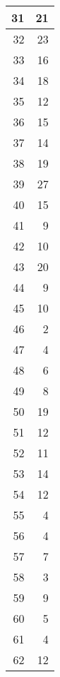 \begin{tabular}{|r|r|}
\hline
31&21\\
\hline
32&23\\
\hline
33&16\\
\hline
34&18\\
\hline
35&12\\
\hline
36&15\\
\hline
37&14\\
\hline
38&19\\
\hline
39&27\\
\hline
40&15\\
\hline
41&9\\
\hline
42&10\\
\hline
43&20\\
\hline
44&9\\
\hline
45&10\\
\hline
46&2\\
\hline
47&4\\
\hline
48&6\\
\hline
49&8\\
\hline
50&19\\
\hline
51&12\\
\hline
52&11\\
\hline
53&14\\
\hline
54&12\\
\hline
55&4\\
\hline
56&4\\
\hline
57&7\\
\hline
58&3\\
\hline
59&9\\
\hline
60&5\\
\hline
61&4\\
\hline
62&12\\
\hline
\end{tabular}
